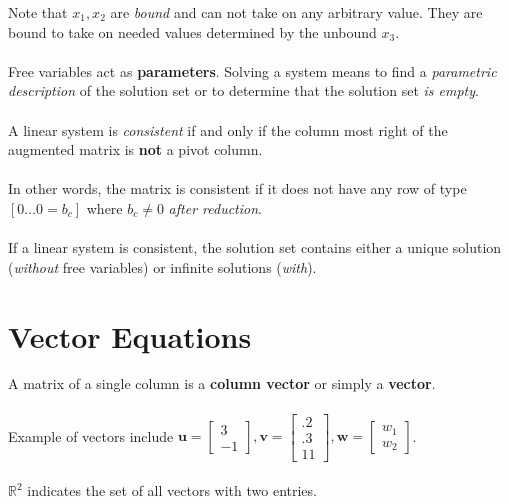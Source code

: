 \documentclass[12pt]{article}
\newcommand{\bm}[1]{\mathbf{{#1}}}
\begin{document}
Note that $x_1, x_2$ are \emph{bound} and can not take on any arbitrary value. They are bound to take on needed values determined by the unbound $x_3$. \\ \\

Free variables act as \textbf{parameters}. Solving a system means to find a \emph{parametric description} of the
solution set or to determine that the solution set \emph{is empty}. \\ \\

A linear system is \emph{consistent} if and only if the column most right of the augmented matrix is \textbf{not} a pivot column. \\ \\

In other words, the matrix is consistent if it does not have any row of type $[0 \dots 0 = b_c]$ where $b_c \neq 0$ \emph{after reduction}. \\ \\

If a linear system is consistent, the solution set contains either a unique solution (\emph{without} free variables) or infinite solutions (\emph{with}).

\section*{Vector Equations}

A matrix of a single column is a \textbf{column vector} or simply a \textbf{vector}. \\ \\

Example of vectors include
$\bm{u} =\begin{bmatrix} 3 \\ -1 \end{bmatrix},
\bm{v} =\begin{bmatrix} .2 \\ .3 \\ 11 \end{bmatrix},
\bm{w} = \begin{bmatrix} w_1 \\ w_2 \end{bmatrix}$. \\ \\

$\mathbb{R}^2$ indicates the set of all vectors with two entries. \\ \\
\end{document}

